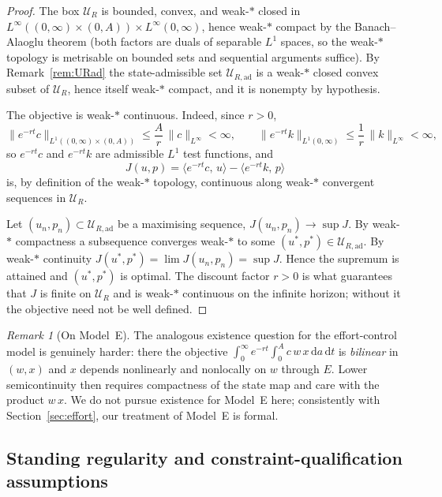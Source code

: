 \documentclass[pdflatex,sn-mathphys-num]{sn-jnl}
\theoremstyle{definition}
\theoremstyle{remark}
\newtheorem{remark}[theorem]{Remark}
\newcommand{\dd}{\,\mathrm{d}}
\begin{document}
\begin{proof}
The box $\mathcal{U}_R$ is bounded, convex, and weak-$\ast$ closed in
$L^\infty((0,\infty)\times(0,A))\times L^\infty(0,\infty)$, hence weak-$\ast$
compact by the Banach--Alaoglu theorem (both factors are duals of separable
$L^1$ spaces, so the weak-$\ast$ topology is metrisable on bounded sets and
sequential arguments suffice). By Remark~\ref{rem:URad} the state-admissible
set $\mathcal{U}_{R,\mathrm{ad}}$ is a weak-$\ast$ closed convex subset of
$\mathcal{U}_R$, hence itself weak-$\ast$ compact, and it is nonempty by
hypothesis.

The objective is weak-$\ast$ continuous. Indeed, since $r>0$,
\[
\|e^{-rt}c\|_{L^1((0,\infty)\times(0,A))}
\le \frac{A}{r}\,\|c\|_{L^\infty}<\infty,
\qquad
\|e^{-rt}k\|_{L^1(0,\infty)}\le\frac{1}{r}\,\|k\|_{L^\infty}<\infty,
\]
so $e^{-rt}c$ and $e^{-rt}k$ are admissible $L^1$ test functions, and
\[
J(u,p)=\langle e^{-rt}c,\,u\rangle-\langle e^{-rt}k,\,p\rangle
\]
is, by definition of the weak-$\ast$ topology, continuous along weak-$\ast$
convergent sequences in $\mathcal{U}_R$.

Let $(u_n,p_n)\subset\mathcal{U}_{R,\mathrm{ad}}$ be a maximising sequence,
$J(u_n,p_n)\to\sup J$. By weak-$\ast$ compactness a subsequence converges
weak-$\ast$ to some $(u^\ast,p^\ast)\in\mathcal{U}_{R,\mathrm{ad}}$. By
weak-$\ast$ continuity $J(u^\ast,p^\ast)=\lim J(u_n,p_n)=\sup J$. Hence the
supremum is attained and $(u^\ast,p^\ast)$ is optimal. The discount factor
$r>0$ is what guarantees that $J$ is finite on $\mathcal{U}_R$ and is
weak-$\ast$ continuous on the infinite horizon; without it the objective
need not be well defined.
\end{proof}

\begin{remark}[On Model~E]
The analogous existence question for the effort-control model is genuinely
harder: there the objective $\int_0^\infty e^{-rt}\int_0^A c\,w\,x\dd a\dd t$
is \emph{bilinear} in $(w,x)$ and $x$ depends nonlinearly and nonlocally on
$w$ through $E$. Lower semicontinuity then requires compactness of the state
map and care with the product $w\,x$. We do not pursue existence for Model~E
here; consistently with Section~\ref{sec:effort}, our treatment of Model~E
is formal.
\end{remark}


\subsection{Standing regularity and constraint-qualification assumptions}
\end{document}
